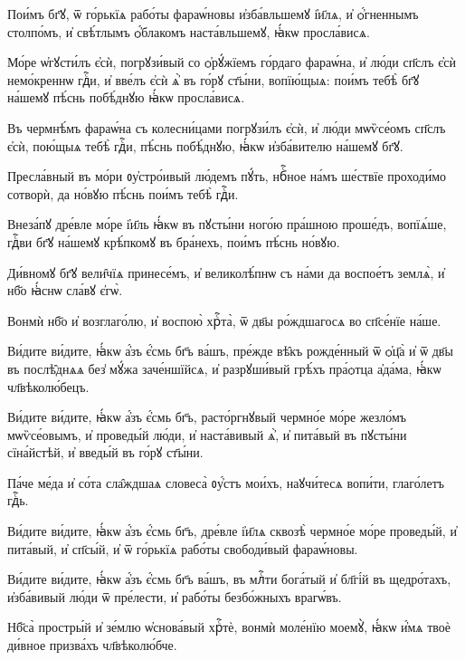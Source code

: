 \hKv Пои́мъ бг҃ꙋ, ѿ го́рькїѧ рабо́ты фараѡ́новы и҆зба́вльшемꙋ  і҆и҃лѧ, и҆ ѻ҆́гненнымъ столпо́мъ, и҆ свѣ́тлымъ ѻ҆́блакомъ  наста́вльшемꙋ, ꙗ҆́кѡ просла́висѧ. 
%

\hKv Мо́ре ѡ҆гꙋсти́лъ є҆сѝ,  погрꙋзи́вый со ѻ҆рꙋ́жїемъ го́рдаго   фараѡ́на, и҆ лю́ди сп҃слъ є҆сѝ немо́креннѡ гдⷭ҇и, и҆  вве́лъ є҆сѝ ѧ҆̀ въ го́рꙋ ст҃ы́ни, вопїю́щыѧ: пои́мъ тебѣ̀  бг҃ꙋ на́шемꙋ пѣ́снь побѣ́днꙋю ꙗ҆́кѡ просла́висѧ. 

\hKv Въ чермнѣ́мъ фараѡ́на съ колесни́цами погрꙋзи́лъ є҆сѝ, и҆  лю́ди мѡѷсе́омъ сп҃слъ є҆сѝ, пою́щыѧ тебѣ̀ гдⷭ҇и,  пѣ́снь побѣ́днꙋю, ꙗ҆́кѡ и҆зба́вителю на́шемꙋ бг҃ꙋ. 

\hKv Пресла́вный въ мо́ри ᲂу҆стро́ивый лю́демъ пꙋ́ть, нбⷭ҇ное  на́мъ ше́ствїе проходи́мо сотворѝ, да но́вꙋю пѣ́снь пои́мъ  тебѣ̀ гдⷭ҇и. 

\hKv Внеза́пꙋ дре́вле мо́ре і҆и҃ль ꙗ҆́кѡ въ пꙋсты́ни ного́ю  пра́шною проше́дъ, вопїѧ́ше, гдⷭ҇ви бг҃ꙋ на́шемꙋ крѣ́пкомꙋ  въ бра́нехъ, пои́мъ пѣ́снь но́вꙋю. 

\hKv Ди́вномꙋ бг҃ꙋ вели̑чїѧ принесе́мъ, и҆ великолѣ́пнѡ съ на́ми  да воспое́тъ землѧ̀, и҆ нб҃о ꙗ҆́снѡ сла́вꙋ є҆гѡ̀.  
%

\hKv Вонмѝ нб҃о и҆ возглаго́лю, и҆ воспою̀ хрⷭ҇та̀, ѿ дв҃ы  ро́ждшагосѧ во сп҃се́нїе на́ше. 

\hKv Ви́дите ви́дите, ꙗ҆́кѡ а҆́зъ є҆́смь бг҃ъ ва́шъ, пре́жде  вѣ̑къ рожде́нный ѿ ѻ҆ц҃а̀ и҆ ѿ дв҃ы въ послѣ̑днѧѧ  без̾ мꙋ́жа заче́ншїйсѧ, и҆ разрꙋши́вый грѣ́хъ пра́ѻтца  а҆да́ма, ꙗ҆́кѡ чл҃вѣколю́бецъ. 

\hKv Ви́дите ви́дите, ꙗ҆́кѡ а҆́зъ є҆́смь бг҃ъ, расто́ргнꙋвый  чермно́е мо́ре жезло́мъ мѡѷсе́овымъ, и҆ проведы́й лю́ди, и҆  наста́вивый ѧ҆̀, и҆ пита́вый въ пꙋсты́ни сїна́йстѣй, и҆  введы́й въ го́рꙋ ст҃ы́ни. 

\hKv Па́че ме́да и҆ со́та сла̑ждшаѧ словеса̀ ᲂу҆́стъ мои́хъ,  наꙋчи́тесѧ вопи́ти, глаго́летъ гдⷭ҇ь. 
%

\hKv Ви́дите ви́дите, ꙗ҆́кѡ  а҆́зъ є҆́смь бг҃ъ, дре́вле і҆и҃лѧ сквозѣ̀ чермно́е мо́ре  проведы́й, и҆ пита́вый, и҆ сп҃сы́й, и҆ ѿ го́рькїѧ рабо́ты  свободи́вый фараѡ́новы.  

\hKv Ви́дите ви́дите, ꙗ҆́кѡ а҆́зъ є҆́смь бг҃ъ ва́шъ, въ млⷭ҇ти  бога́тый и҆ бл҃гі́й въ щедро́тахъ, и҆зба́вивый лю́ди ѿ  пре́лести, и҆ рабо́ты безбо́жныхъ врагѡ́въ. 

\hKv Нб҃са̀ простры́й и҆ зе́млю ѡ҆снова́вый хрⷭ҇тѐ, вонмѝ  моле́нїю моемꙋ̀, ꙗ҆́кѡ и҆́мѧ твоѐ ди́вное призва́хъ  чл҃вѣколю́бче. 
%

